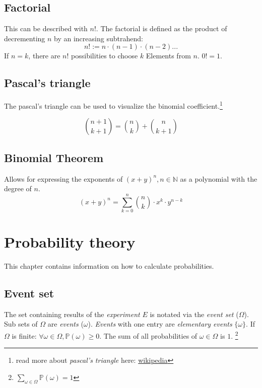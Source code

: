 \documentclass[twoside, a4paper, twocolumn]{article}
\begin{document}
    \subsection{Factorial}
    This can be described with $n!$. The factorial is defined as the
    product of decrementing $n$ by an increasing subtrahend:
    \begin{equation}
        n! := n \cdot (n-1) \cdot (n-2) \textrm{...}
    \end{equation}
    If $n = k$, there are $n!$ possibilities to choose $k$ Elements from $n$.
    $0! = 1$.

    \subsection{Pascal's triangle}
    The pascal's triangle can be used to visualize the binomial
    coefficient.\footnote{read more about \textit{pascal's triangle}
    here: \href{https://en.wikipedia.org/wiki/Pascal's_triangle}{wikipedia}}

    \begin{equation}
        \binom{n+1}{k+1} = \binom{n}{k} + \binom{n}{k+1}
    \end{equation}

    \subsection{Binomial Theorem}
    Allows for expressing the exponents of $(x+y)^n, n \in \mathbb{N}$ as a
    polynomial with the degree of $n$.
    \begin{equation}
        (x+y)^n = \sum^n_{k=0} \binom{n}{k} \cdot x^k \cdot y^{n-k}
    \end{equation}

    \section{Probability theory}
    This chapter contains information on how to calculate probabilities.

    \subsection{Event set} The set containing results of the
    \textit{experiment} $E$ is notated via the \textit{event set} ($\Omega$).
    Sub sets of $\Omega$ are \textit{events} ($\omega$). \textit{Events} with
    one entry are \textit{elementary events} $\{\omega\}$. If $\Omega$ is
    finite: $\forall \omega \in \Omega,\mathbb{P}(\omega) \geq 0$. The sum of
    all probabilities of $\omega \in \Omega$ is $1$.
    \footnote{
        \begin{math}
            \sum_{\omega \in \Omega} \mathbb{P}(\omega) = 1
        \end{math}
    }
\end{document}
